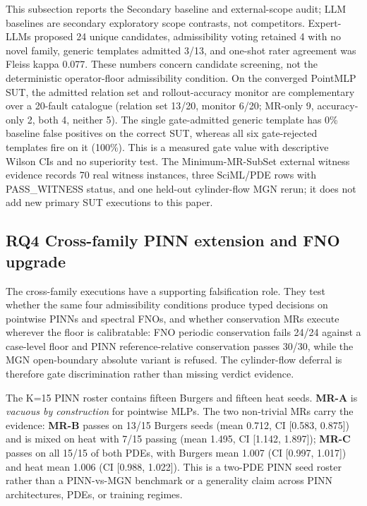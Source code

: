 \documentclass[preprint,12pt]{elsarticle}
\begin{document}
This subsection reports the Secondary baseline and external-scope audit; LLM baselines are secondary exploratory scope contrasts, not competitors. Expert-LLMs proposed 24 unique candidates, admissibility voting retained 4 with no novel family, generic templates admitted 3/13, and one-shot rater agreement was Fleiss kappa 0.077. These numbers concern candidate screening, not the deterministic operator-floor admissibility condition. On the converged PointMLP SUT, the admitted relation set and rollout-accuracy monitor are complementary over a 20-fault catalogue (relation set 13/20, monitor 6/20; MR-only 9, accuracy-only 2, both 4, neither 5). The single gate-admitted generic template has 0\% baseline false positives on the correct SUT, whereas all six gate-rejected templates fire on it (100\%). This is a measured gate value with descriptive Wilson CIs and no superiority test. The Minimum-MR-SubSet external witness evidence records 70 real witness instances, three SciML/PDE rows with PASS\_WITNESS status, and one held-out cylinder-flow MGN rerun; it does not add new primary SUT executions to this paper.

\subsection{RQ4 Cross-family PINN extension and FNO upgrade}
\label{subsec:pinn-extension}

The cross-family executions have a supporting falsification role. They test whether the same four admissibility conditions produce typed decisions on pointwise PINNs and spectral FNOs, and whether conservation MRs execute wherever the floor is calibratable: FNO periodic conservation fails 24/24 against a case-level floor and PINN reference-relative conservation passes 30/30, while the MGN open-boundary absolute variant is refused. The cylinder-flow deferral is therefore gate discrimination rather than missing verdict evidence.

The K=15 PINN roster contains fifteen Burgers and fifteen heat seeds. \textbf{MR-A} is \emph{vacuous by construction} for pointwise MLPs. The two non-trivial MRs carry the evidence: \textbf{MR-B} passes on 13/15 Burgers seeds (mean 0.712, CI [0.583, 0.875]) and is mixed on heat with 7/15 passing (mean 1.495, CI [1.142, 1.897]); \textbf{MR-C} passes on all 15/15 of both PDEs, with Burgers mean 1.007 (CI [0.997, 1.017]) and heat mean 1.006 (CI [0.988, 1.022]). This is a two-PDE PINN seed roster rather than a PINN-vs-MGN benchmark or a generality claim across PINN architectures, PDEs, or training regimes.
\end{document}
